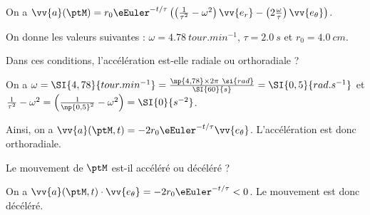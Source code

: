 \begin{corrige}
	On a $\vv{a}(\ptM)=r_0 \eEuler^{-t/\tau}  \left(\left(\frac{1}{\tau^2}-\omega^2\right)\vv{e_r}-\left(2\frac{\omega}{\tau}\right)\vv{e_\theta}\right)$.
\end{corrige}	



\pauseEntrainement

On donne les valeurs suivantes : 
$\omega=\SI{4,78}{tour.min^{-1}}$,  $\tau=\SI{2,0}{s}$ et $r_0=\SI{4,0}{cm}$. 

\repriseEntrainement



\begin{enonce}
	Dans ces conditions, l'accélération est-elle radiale ou orthoradiale ?
\end{enonce}


\begin{corrige}
	On a $\omega=\SI{4,78}{tour.min^{-1}}=\frac{\np{4,78}\times 2\pi\ \si{rad}}{\SI{60}{s}}=\SI{0,5}{rad.s^{-1}}$ et 
	$\frac{1}{\tau^2}-\omega^2=\left(\frac{1}{\np{0,5}^2}-\omega^2 \right)=\SI{0}{s^{-2}}$. 
	
	Ainsi, on a 
	$\vv{a}(\ptM,t)=-2r_0 \eEuler^{-t/\tau} \vv{e_\theta}$.	L'accélération est donc orthoradiale. 
\end{corrige}	




\begin{enonce}
	Le mouvement de $\ptM$ est-il accéléré ou décéléré ?
\end{enonce}


\begin{corrige}
	On a $\vv{a}(\ptM,t)\cdot \vv{e_\theta} =-2r_0 \eEuler^{-t/\tau} <0$.
	Le mouvement est donc décéléré. 
\end{corrige}	

